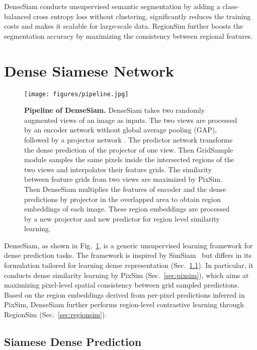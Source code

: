 \documentclass[runningheads]{llncs}
\begin{document}
DenseSiam conducts unsupervised semantic segmentation by adding a class-balanced cross entropy loss without clustering, significantly reduces the training costs and makes it scalable for large-scale data.
RegionSim further boosts the segmentation accuracy by maximizing the consistency between regional features.
 \section{Dense Siamese Network}\label{sec:methods}

\begin{figure}[t]
	\centering\texttt{[image: figures/pipeline.jpg]}
\caption{\small{
	  \textbf{Pipeline of DenseSiam.}
	  DenseSiam takes two randomly augmented views of an image  as inputs.
	  The two views are processed by an encoder network  without global average pooling (GAP), followed by a projector network .
	  The predictor network  transforms the dense prediction of the projector of one view.
	  Then GridSample module samples the same pixels inside the intersected regions of the two views and interpolates their feature grids.
	  The similarity between feature grids from two views are maximized by PixSim.
		  Then DenseSiam multiplies the features of encoder and the dense predictions by projector  in the overlapped area to obtain region embeddings of each image.
		  These region embeddings are processed by a new projector  and new predictor  for region level similarity learning.
	}}\label{fig:pipeline}
\end{figure}

DenseSiam, as shown in Fig.~\ref{fig:pipeline}, is a generic unsupervised learning framework for dense prediction tasks. 
The framework is inspired by SimSiam~\cite{simsiam} but differs in its formulation tailored for learning dense representation (Sec.~\ref{sec:siamese}). 
In particular, it conducts dense similarity learning by PixSim (Sec.~\ref{sec:pixsim}), which aims at maximizing pixel-level spatial consistency between grid sampled predictions. 
Based on the region embeddings derived from per-pixel predictions inferred in PixSim, DenseSiam further performs region-level contrastive learning through RegionSim (Sec.~\ref{sec:regionsim}).

\subsection{Siamese Dense Prediction}\label{sec:siamese}
\end{document}
